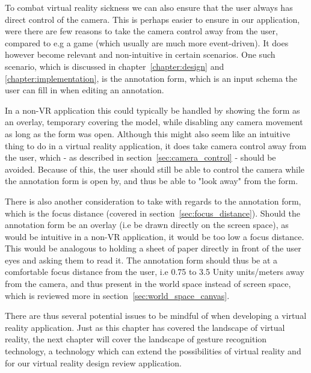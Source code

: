 To combat virtual reality sickness we can also ensure that the user always has direct control of the camera. 
This is perhaps easier to ensure in our application, were there are few reasons to take the camera control away from the user, 
compared to e.g a game (which usually are much more event-driven). It does however become relevant and non-intuitive in certain scenarios.  
One such scenario, which is discussed in chapter~\ref{chapter:design} and \ref{chapter:implementation}, is the annotation form, which is an input schema the user can fill in
when editing an annotation. 

In a non-VR application this could typically be handled by showing the form as an overlay, temporary covering the model, while disabling any camera movement as long as the
form was open. Although this might also seem like an intuitive thing to do in a virtual reality application, it does take camera control away from the user, which - as described in
section~\vref{sec:camera_control} - should be avoided. Because of this,
the user should still be able to control the camera while the annotation form is open by, and thus be able to "look away" from the form. 

There is also another consideration to take with regards to the annotation form, which is the focus distance (covered in section~\vref{sec:focus_distance}). 
Should the annotation form be an overlay (i.e be drawn directly on the screen space), as would be intuitive in a non-VR application, 
it would be too low a focus distance. This would be analogous to holding a sheet of paper directly in front
of the user eyes and asking them to read it. The annotation form should thus be at a comfortable focus distance from the user, i.e 0.75 to 3.5 Unity units/meters away 
from the camera, and thus present in the world space instead of screen space, which is reviewed more in section~\vref{sec:world_space_canvas}. 

There are thus several potential issues to be mindful of when developing a virtual reality application. Just as this chapter 
has covered the landscape of virtual reality, the next chapter will cover the landscape of gesture recognition technology, a technology which can extend the possibilities
of virtual reality and for our virtual reality design review application.